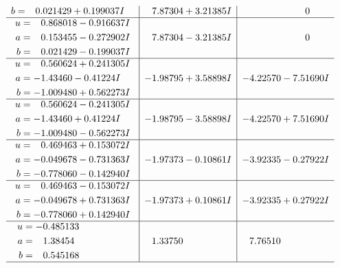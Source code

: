\documentclass[1p]{elsarticle_modified}
\theoremstyle{definition}
\begin{document}
$$\begin{array}{c|c|c}
\begin{aligned}
b &= \phantom{-}0.021429 + 0.199037 I\end{aligned}
 & \phantom{-}7.87304 + 3.21385 I & \phantom{-0.000000 } 0 \\ \hline\begin{aligned}
u &= \phantom{-}0.868018 - 0.916637 I \\
a &= \phantom{-}0.153455 - 0.272902 I \\
b &= \phantom{-}0.021429 - 0.199037 I\end{aligned}
 & \phantom{-}7.87304 - 3.21385 I & \phantom{-0.000000 } 0 \\ \hline\begin{aligned}
u &= \phantom{-}0.560624 + 0.241305 I \\
a &= -1.43460 - 0.41224 I \\
b &= -1.009480 + 0.562273 I\end{aligned}
 & -1.98795 + 3.58898 I & -4.22570 - 7.51690 I \\ \hline\begin{aligned}
u &= \phantom{-}0.560624 - 0.241305 I \\
a &= -1.43460 + 0.41224 I \\
b &= -1.009480 - 0.562273 I\end{aligned}
 & -1.98795 - 3.58898 I & -4.22570 + 7.51690 I \\ \hline\begin{aligned}
u &= \phantom{-}0.469463 + 0.153072 I \\
a &= -0.049678 - 0.731363 I \\
b &= -0.778060 - 0.142940 I\end{aligned}
 & -1.97373 - 0.10861 I & -3.92335 - 0.27922 I \\ \hline\begin{aligned}
u &= \phantom{-}0.469463 - 0.153072 I \\
a &= -0.049678 + 0.731363 I \\
b &= -0.778060 + 0.142940 I\end{aligned}
 & -1.97373 + 0.10861 I & -3.92335 + 0.27922 I \\ \hline\begin{aligned}
u &= -0.485133\phantom{ +0.000000I} \\
a &= \phantom{-}1.38454\phantom{ +0.000000I} \\
b &= \phantom{-}0.545168\phantom{ +0.000000I}\end{aligned}
 & \phantom{-}1.33750\phantom{ +0.000000I} & \phantom{-}7.76510\phantom{ +0.000000I}\\
 \hline 
 \end{array}$$\newpage\newpage\renewcommand{\arraystretch}{1}
\end{document}
